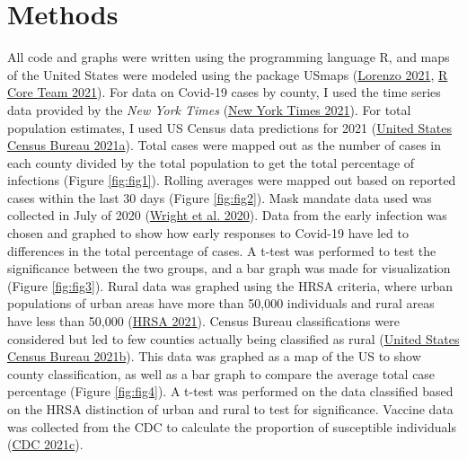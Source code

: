 \documentclass[
  12pt,
]{article}
\begin{document}
\hypertarget{methods}{%
\section{Methods}\label{methods}}

All code and graphs were written using the programming language R, and maps of the United States were modeled using the package USmaps (\protect\hyperlink{ref-lorenzo_usmap_2021}{Lorenzo 2021}, \protect\hyperlink{ref-r_core_team_r_2021}{R Core Team 2021}). For data on Covid-19 cases by county, I used the time series data provided by the \emph{New York Times} (\protect\hyperlink{ref-new_york_times_coronavirus_2021}{New York Times 2021}). For total population estimates, I used US Census data predictions for 2021 (\protect\hyperlink{ref-united_states_census_bureau_county_2021}{United States Census Bureau 2021a}). Total cases were mapped out as the number of cases in each county divided by the total population to get the total percentage of infections (Figure \ref{fig:fig1}). Rolling averages were mapped out based on reported cases within the last 30 days (Figure \ref{fig:fig2}). Mask mandate data used was collected in July of 2020 (\protect\hyperlink{ref-wright_tracking_2020}{Wright et al. 2020}). Data from the early infection was chosen and graphed to show how early responses to Covid-19 have led to differences in the total percentage of cases. A t-test was performed to test the significance between the two groups, and a bar graph was made for visualization (Figure \ref{fig:fig3}). Rural data was graphed using the HRSA criteria, where urban populations of urban areas have more than 50,000 individuals and rural areas have less than 50,000 (\protect\hyperlink{ref-hrsa_defining_2021}{HRSA 2021}). Census Bureau classifications were considered but led to few counties actually being classified as rural (\protect\hyperlink{ref-united_states_census_bureau_2010_2021}{United States Census Bureau 2021b}). This data was graphed as a map of the US to show county classification, as well as a bar graph to compare the average total case percentage (Figure \ref{fig:fig4}). A t-test was performed on the data classified based on the HRSA distinction of urban and rural to test for significance. Vaccine data was collected from the CDC to calculate the proportion of susceptible individuals (\protect\hyperlink{ref-cdc_covid-19_2021}{CDC 2021c}).
\end{document}
